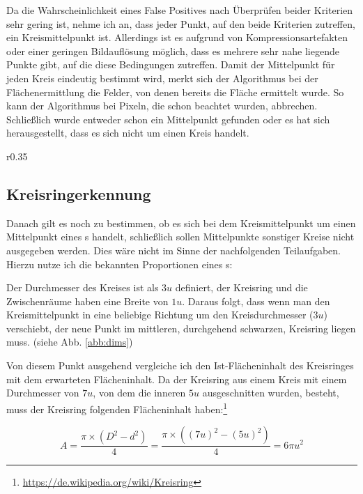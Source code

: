 Da die Wahrscheinlichkeit eines False Positives nach Überprüfen beider Kriterien sehr gering ist, nehme ich an, dass jeder Punkt, auf den beide Kriterien zutreffen, ein Kreismittelpunkt ist. 
Allerdings ist es aufgrund von Kompressionsartefakten oder einer geringen Bildauflösung möglich, dass es mehrere sehr nahe liegende Punkte gibt, auf die diese Bedingungen zutreffen. Damit der Mittelpunkt für jeden Kreis eindeutig bestimmt wird, merkt sich der Algorithmus bei der Flächenermittlung die Felder, von denen bereits die Fläche ermittelt wurde. 
So kann der Algorithmus bei Pixeln, die schon beachtet wurden, abbrechen. Schließlich wurde entweder schon ein Mittelpunkt gefunden oder es hat sich herausgestellt, dass es sich nicht um einen Kreis handelt.

\begin{wrapfigure}{r}{0.35\textwidth}
  \centering
  
  \caption{Größenverhältnisse}
  \label{abb:dims}
\end{wrapfigure}

\subsection{Kreisringerkennung}
Danach gilt es noch zu bestimmen, ob es sich bei dem Kreismittelpunkt um einen Mittelpunkt eines \task{}s handelt, schließlich sollen Mittelpunkte sonstiger Kreise nicht ausgegeben werden. Dies wäre nicht im Sinne der nachfolgenden Teilaufgaben. Hierzu nutze ich die bekannten Proportionen eines \task{}s:

Der Durchmesser des Kreises ist als \(3u\) definiert, der Kreisring und die Zwischenräume haben eine Breite von \(1u\). 
Daraus folgt, dass wenn man den Kreismittelpunkt in eine beliebige Richtung um den Kreisdurchmesser (\(3u\)) verschiebt, der neue Punkt im mittleren, durchgehend schwarzen, Kreisring liegen muss. (siehe Abb. \ref{abb:dims})

Von diesem Punkt ausgehend vergleiche ich den Ist-Flächeninhalt des Kreisringes mit dem erwarteten Flächeninhalt. Da der Kreisring aus einem Kreis mit einem Durchmesser von \(7u\), von dem die inneren \(5u\) ausgeschnitten wurden, besteht, muss der Kreisring folgenden Flächeninhalt haben:\footnote{\url{https://de.wikipedia.org/wiki/Kreisring}}

\begin{equation}
	A=\frac{\pi{}\times(D^2-d^2)}{4}=\frac{\pi{}\times((7u)^2-(5u)^2)}{4}=6\pi{}u^2
\end{equation}

